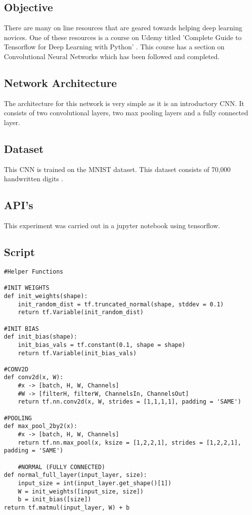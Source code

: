 \subsection*{Objective}
There are many on line resources that are geared towards helping deep learning novices.
One of these resources is a course on Udemy titled 'Complete Guide to Tensorflow for Deep Learning with Python' \parencite{udemy}.
This course has a section on Convolutional Neural Networks which has been followed and completed.

\subsection*{Network Architecture}
The architecture for this network is very simple as it is an introductory CNN.
It consists of two convolutional layers, two max pooling layers and a fully connected layer.

\subsection*{Dataset}
This CNN is trained on the MNIST dataset.
This dataset consists of 70,000 handwritten digits \parencite{mnist}.

\subsection*{API's}
This experiment was carried out in a jupyter notebook using tensorflow.

\subsection*{Script}
\begin{lstlisting}[style=Python]
#Helper Functions

#INIT WEIGHTS
def init_weights(shape):
    init_random_dist = tf.truncated_normal(shape, stddev = 0.1)
    return tf.Variable(init_random_dist)

#INIT BIAS
def init_bias(shape):
    init_bias_vals = tf.constant(0.1, shape = shape)
    return tf.Variable(init_bias_vals)

#CONV2D
def conv2d(x, W):
    #x -> [batch, H, W, Channels]
    #W -> [filterH, filterW, ChannelsIn, ChannelsOut]
    return tf.nn.conv2d(x, W, strides = [1,1,1,1], padding = 'SAME')

#POOLING
def max_pool_2by2(x):
    #x -> [batch, H, W, Channels]
    return tf.nn.max_pool(x, ksize = [1,2,2,1], strides = [1,2,2,1], padding = 'SAME')

    #NORMAL (FULLY CONNECTED)
def normal_full_layer(input_layer, size):
    input_size = int(input_layer.get_shape()[1])
    W = init_weights([input_size, size])
    b = init_bias([size])
return tf.matmul(input_layer, W) + b
\end{lstlisting}

